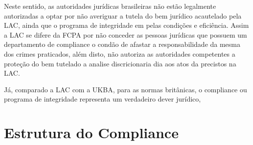 Neste sentido, as autoridades jurídicas brasileiras não estão legalmente autorizadas a optar por não averiguar a tutela do bem jurídico acautelado pela LAC, ainda que o programa de integridade em pelas condições e eficiência. Assim a LAC se difere da FCPA por não conceder as pessoas jurídicas que possuem um departamento de compliance o condão de afastar a responsabilidade da mesma dos crimes praticados, além disto, não autoriza as autoridades competentes a proteção do bem tutelado a analise discricionaria 
dia aos atos da precistos na LAC. 

Já, comparado a LAC com a UKBA, para as normas britânicas, o compliance ou programa de integridade representa um verdadeiro dever jurídico, 


\chapter{Estrutura do Compliance}